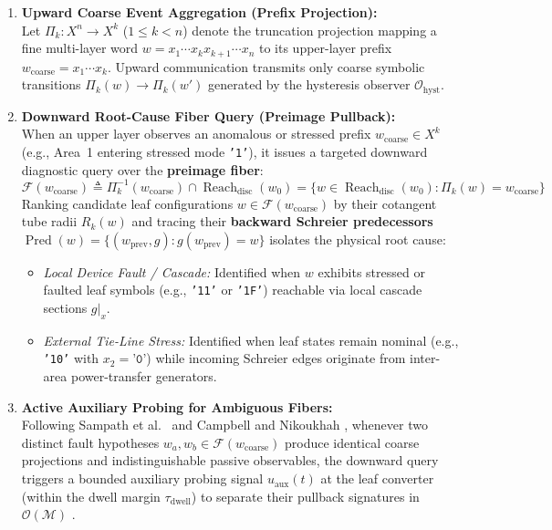 \documentclass[11pt]{article}
\begin{document}
\begin{enumerate}
    \item \textbf{Upward Coarse Event Aggregation (Prefix Projection):} \\
    Let $\Pi_k : X^n \to X^k$ ($1 \le k < n$) denote the truncation projection mapping a fine multi-layer word $w = x_1 \cdots x_k x_{k+1} \cdots x_n$ to its upper-layer prefix $w_{\mathrm{coarse}} = x_1 \cdots x_k$. Upward communication transmits only coarse symbolic transitions $\Pi_k(w) \to \Pi_k(w')$ generated by the hysteresis observer $\mathcal{O}_{\mathrm{hyst}}$.

    \item \textbf{Downward Root-Cause Fiber Query (Preimage Pullback):} \\
    When an upper layer observes an anomalous or stressed prefix $w_{\mathrm{coarse}} \in X^k$ (e.g., Area~1 entering stressed mode \texttt{'1'}), it issues a targeted downward diagnostic query over the \textbf{preimage fiber}:
    \begin{equation}
    \mathcal{F}(w_{\mathrm{coarse}}) \triangleq \Pi_k^{-1}(w_{\mathrm{coarse}}) \cap \operatorname{Reach}_{\mathrm{disc}}(w_0) = \big\{ w \in \operatorname{Reach}_{\mathrm{disc}}(w_0) : \Pi_k(w) = w_{\mathrm{coarse}} \big\}
    \end{equation}
    Ranking candidate leaf configurations $w \in \mathcal{F}(w_{\mathrm{coarse}})$ by their cotangent tube radii $R_k(w)$ and tracing their \textbf{backward Schreier predecessors} $\operatorname{Pred}(w) = \{(w_{\mathrm{prev}}, g) : g(w_{\mathrm{prev}}) = w\}$ isolates the physical root cause:
    \begin{itemize}
        \item \emph{Local Device Fault / Cascade:} Identified when $w$ exhibits stressed or faulted leaf symbols (e.g., \texttt{'11'} or \texttt{'1F'}) reachable via local cascade sections $g|_x$.
        \item \emph{External Tie-Line Stress:} Identified when leaf states remain nominal (e.g., \texttt{'10'} with $x_2 = \texttt{'0'}$) while incoming Schreier edges originate from inter-area power-transfer generators.
    \end{itemize}

    \item \textbf{Active Auxiliary Probing for Ambiguous Fibers:} \\
    Following Sampath et al.\ \cite{Sampath1995} and Campbell and Nikoukhah \cite{CampbellNikoukhah2004}, whenever two distinct fault hypotheses $w_a, w_b \in \mathcal{F}(w_{\mathrm{coarse}})$ produce identical coarse projections and indistinguishable passive observables, the downward query triggers a bounded auxiliary probing signal $u_{\mathrm{aux}}(t)$ at the leaf converter (within the dwell margin $\tau_{\mathrm{dwell}}$) to separate their pullback signatures in $\mathcal{O}(\mathcal{M})$ \cite{Nestruev2003}.
\end{enumerate}
\end{document}
